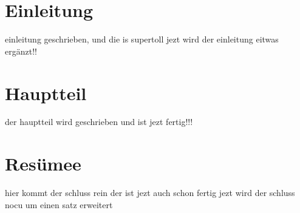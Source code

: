 \documentclass[11pt,a4paper]{article}
\begin{document}
\section{Einleitung}

einleitung geschrieben, und die is supertoll
jezt wird der einleitung eitwas ergänzt!!

\section{Hauptteil}

der hauptteil wird geschrieben und ist jezt fertig!!!

\section{Resümee}

hier kommt der schluss rein der ist jezt auch schon fertig
jezt wird der schluss nocu um einen satz erweitert
\end{document}
